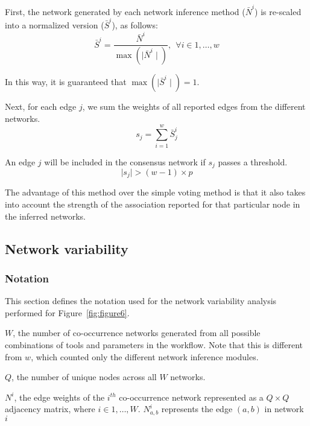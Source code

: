 \documentclass[letterpaper,12pt]{article}
\begin{document}
  First, the network generated by each network inference method ($\bar{N}^i$) is re-scaled into a normalized version ($\bar{S}^i$), as follows:
  \begin{equation}
    \bar{S}^{i} = \frac{\bar{N}^{i}}{\max(\mid \bar{N}^{i} \mid)},~~\forall i \in {1, \dots, w}
    \label{eqn:scaled-sum-rescaling}
  \end{equation}

    In this way, it is guaranteed that $\max(\mid \bar{S}^i \mid) = 1$.


  Next, for each edge $j$, we sum the weights of all reported edges from the different networks.
  \begin{equation}
    s_j = \sum_{i=1}^{w} \bar{S}^i_j
    \label{eqn:scaled-sum}
  \end{equation}


  An edge $j$ will be included in the consensus network if $s_j$ passes a threshold.
  \begin{equation}
    \mid s_j \mid > (w - 1) \times p
    \label{eq:scaled-sum2}
  \end{equation}

  The advantage of this method over the simple voting method is that it also takes into account the strength of the association reported for that particular node in the inferred networks.

  \subsection*{Network variability}

  \subsubsection*{Notation}
  \vspace{-5mm}
  This section defines the notation used for the network variability analysis performed for Figure~\ref{fig:figure6}.

  $W$, the number of co-occurrence networks generated from all possible combinations of tools and parameters in the workflow.
  Note that this is different from $w$, which counted only the different network inference modules.

  $Q$, the number of unique nodes across all $W$ networks.

  $N^i$, the edge weights of the $i^{th}$ co-occurrence network represented as a $Q \times Q$ adjacency matrix, where $i \in {1, \dots, W}$.
  $N^i_{a,b}$ represents the edge $(a,b)$ in network $i$
\end{document}
